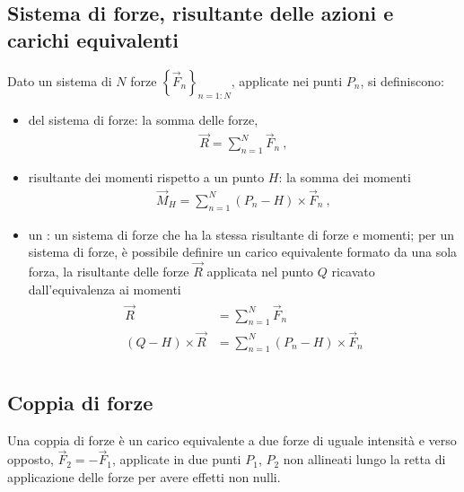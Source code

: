 \documentclass[letterpaper,10pt,italian]{jupyterBook}
\begin{document}
\subsection{Sistema di forze, risultante delle azioni e carichi equivalenti}
\label{\detokenize{ch/mechanics/actions-types:sistema-di-forze-risultante-delle-azioni-e-carichi-equivalenti}}
\sphinxAtStartPar
Dato un sistema di \(N\) forze \(\left\{ \vec{F}_n \right\}_{n=1:N}\), applicate nei punti \(P_n\), si definiscono:
\begin{itemize}
\item {} 
\sphinxAtStartPar
{} del sistema di forze: la somma delle forze,
\begin{equation*}
\begin{split}\vec{R} = \sum_{n=1}^{N} \vec{F}_n \ ,\end{split}
\end{equation*}
\item {} 
\sphinxAtStartPar
risultante dei momenti rispetto a un punto \(H\): la somma dei momenti
\begin{equation*}
\begin{split}\vec{M}_H = \sum_{n=1}^{N} (P_n - H) \times \vec{F}_n \ ,\end{split}
\end{equation*}
\item {} 
\sphinxAtStartPar
un : un sistema di forze che ha la stessa risultante di forze e momenti; per un sistema di forze, è possibile definire un carico equivalente formato da una sola forza, la risultante delle forze \(\vec{R}\) applicata nel punto \(Q\) ricavato dall’equivalenza ai momenti
\begin{equation*}
\begin{split}\begin{aligned}
    \vec{R} & = \sum_{n=1}^{N} \vec{F}_n \\
    (Q - H) \times \vec{R} & = \sum_{n=1}^{N} (P_n - H) \times \vec{F}_n \\
  \end{aligned}\end{split}
\end{equation*}
\end{itemize}


\subsection{Coppia di forze}
\label{\detokenize{ch/mechanics/actions-types:coppia-di-forze}}
\sphinxAtStartPar
Una coppia di forze è un carico equivalente a due forze di uguale intensità e verso opposto, \(\vec{F}_2 = - \vec{F}_1\), applicate in due punti \(P_1\), \(P_2\) non allineati lungo la retta di applicazione delle forze per avere effetti non nulli.
\end{document}
